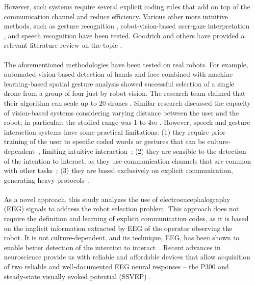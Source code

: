 \documentclass[smallextended]{svjour3}
\begin{document}
However, such systems require several explicit coding rules that add on top of the communication channel and reduce efficiency. 
Various other more intuitive methods, such as gesture recognition \cite{Couture-Beil2010,Jones2010,Monajjemi2013,Nagietal2014}, robot-vision-based user-gaze interpretation \cite{Couture-Beil2010,Monajjemi2013,Pourmehr2013}, and speech recognition \cite{Pourmehr2013} have been tested. 
Goodrich and others have provided a relevant literature review on the topic \cite{goodrich2007human,Rule2012,yanco2004classifying}.\\
\\
The aforementioned methodologies have been tested on real robots. For example, automated vision-based detection of hands and face combined with machine learning-based spatial gesture analysis showed successful selection of a single drone from a group of four just by robot vision. 
The research team claimed that their algorithm can scale up to 20 drones \cite{Nagietal2014}. Similar research discussed the capacity of vision-based systems considering varying distance between the user and the robot; in particular, the studied range was 1 to 4$m$ \cite{Couture-Beil2010}. 
However, speech and gesture interaction systems have some practical limitations: (1) they require prior training of the user to specific coded words or gestures that can be culture-dependent~\cite{Trovato2013}, limiting intuitive interaction~\cite{Kirchner2015};
(2) they are sensible to the detection of the intention to interact, as they use communication channels that are common with other tasks~\cite{Rzepecki2012}; (3) they are based exclusively on explicit communication, generating heavy protocols~\cite{Kirchner2015}.\\
\\ 
As a novel approach, this study analyzes the use of electroencephalography (EEG) signals to address the robot selection problem. 
This approach does not require the definition and learning of explicit communication codes, as it is based on the implicit information extracted by EEG of the operator observing the robot. 
It is not culture-dependent, and its technique, EEG, has been shown to enable better detection of the intention to interact~\cite{Rzepecki2012}.
Recent advances in neuroscience provide us with reliable and affordable devices that allow acquisition of two reliable and well-documented EEG neural responses -- the P300 and steady-state visually evoked potential (SSVEP) \cite{Beverina2003,Bi2013,Zhu2010}. 
\end{document}
